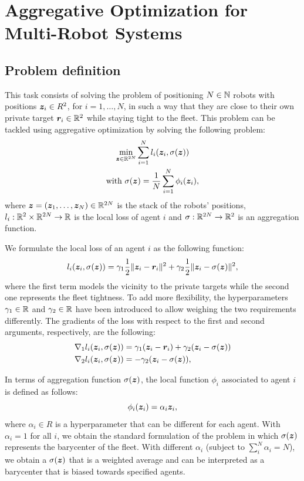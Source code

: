 \documentclass[a4paper,11pt,oneside]{book}
\begin{document}
\chapter{Aggregative Optimization for Multi-Robot Systems} \label{ch:aggregative}



\section{Problem definition}

This task consists of solving the problem of positioning $N \in {\mathbb{N}}$ robots with positions ${\bm{z}}_i \in R^2$, for $i=1, \dots, N$, in such a way that they are close to their own private target ${\bm{r}}_i \in {\mathbb{R}}^2$ while staying tight to the fleet. This problem can be tackled using aggregative optimization by solving the following problem:
\[
      \begin{gathered}
            \min_{{\bm{z}} \in {\mathbb{R}}^{2N}} \sum_{i=1}^{N} l_i({\bm{z}}_i, \sigma({\bm{z}})) \\
            \text{with } \sigma({\bm{z}}) = \frac{1}{N} \sum_{i=1}^{N} \phi_i({\bm{z}}_i),
      \end{gathered}
\]
where ${\bm{z}}=({\bm{z}}_1, \dots, {\bm{z}}_N) \in {\mathbb{R}}^{2N}$ is the stack of the robots' positions, $l_i: {\mathbb{R}}^{2} \times {\mathbb{R}}^{2N} \rightarrow {\mathbb{R}}$ is the local loss of agent $i$ and $\sigma: {\mathbb{R}}^{2N} \rightarrow {\mathbb{R}}^2$ is an aggregation function.

We formulate the local loss of an agent $i$ as the following function:
\[
      l_i({\bm{z}}_i, \sigma({\bm{z}})) = \gamma_1 \frac{1}{2} \Vert {\bm{z}}_i - {\bm{r}}_i \Vert^2 + \gamma_2 \frac{1}{2} \Vert {\bm{z}}_i - \sigma({\bm{z}}) \Vert^2,
\]
where the first term models the vicinity to the private targets while the second one represents the fleet tightness. To add more flexibility, the hyperparameters $\gamma_1 \in {\mathbb{R}}$ and $\gamma_2 \in {\mathbb{R}}$ have been introduced to allow weighing the two requirements differently. The gradients of the loss with respect to the first and second arguments, respectively, are the following:
\[
      \begin{split}
            \nabla_1 l_i({\bm{z}}_i, \sigma({\bm{z}})) &= \gamma_1 ({\bm{z}}_i - {\bm{r}}_i) + \gamma_2 ({\bm{z}}_i - \sigma({\bm{z}})) \\
            \nabla_2 l_i({\bm{z}}_i, \sigma({\bm{z}})) &= -\gamma_2 ({\bm{z}}_i - \sigma({\bm{z}})),
      \end{split}
\]

In terms of aggregation function $\sigma({\bm{z}})$, the local function $\phi_i$ associated to agent $i$ is defined as follows:
\[
      \phi_i({\bm{z}}_i) = \alpha_i {\bm{z}}_i,
\]
where $\alpha_i \in R$ is a hyperparameter that can be different for each agent. With $\alpha_i = 1$ for all $i$, we obtain the standard formulation of the problem in which $\sigma({\bm{z}})$ represents the barycenter of the fleet. With different $\alpha_i$ (subject to $\sum_i^N \alpha_i = N$), we obtain a $\sigma({\bm{z}})$ that is a weighted average and can be interpreted as a barycenter that is biased towards specified agents.
\end{document}
